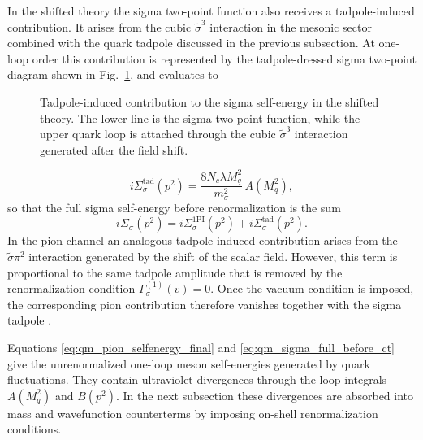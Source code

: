In the shifted theory the sigma two-point function also receives a
tadpole-induced contribution. It arises from the cubic
\(\tilde{\sigma}^3\) interaction in the mesonic sector combined with
the quark tadpole discussed in the previous subsection. At one-loop
order this contribution is represented by the tadpole-dressed sigma
two-point diagram shown in Fig.~\ref{fig:qm_sigma_tadpole_selfenergy},
and evaluates to

\begin{figure}[t]
\centering
{}
\caption{Tadpole-induced contribution to the sigma self-energy in the shifted theory. The lower line is the sigma two-point function, while the upper quark loop is attached through the cubic \(\tilde{\sigma}^3\) interaction generated after the field shift.}
\label{fig:qm_sigma_tadpole_selfenergy}
\end{figure}

\begin{equation}
i\Sigma_{\sigma}^{\mathrm{tad}}(p^2)
=
\frac{8N_c\lambda M_q^2}{m_\sigma^2}\,A(M_q^2),
\label{eq:qm_sigma_tadpole_part}
\end{equation}
so that the full sigma self-energy before renormalization is the sum
\begin{equation}
i\Sigma_\sigma(p^2)
=
i\Sigma_{\sigma}^{\mathrm{1PI}}(p^2)
+
i\Sigma_{\sigma}^{\mathrm{tad}}(p^2).
\label{eq:qm_sigma_full_before_ct}
\end{equation}
In the pion channel an analogous tadpole-induced contribution arises
from the $\tilde{\sigma}\pi^2$ interaction generated by the shift of
the scalar field. However, this term is proportional to the same
tadpole amplitude that is removed by the renormalization condition
$\Gamma_\sigma^{(1)}(v)=0$. Once the vacuum condition is imposed,
the corresponding pion contribution therefore vanishes together with
the sigma tadpole \cite{Folkestad2018}.

Equations \eqref{eq:qm_pion_selfenergy_final} and
\eqref{eq:qm_sigma_full_before_ct} give the unrenormalized one-loop
meson self-energies generated by quark fluctuations. They contain
ultraviolet divergences through the loop integrals \(A(M_q^2)\) and
\(B(p^2)\). In the next subsection these divergences are absorbed into
mass and wavefunction counterterms by imposing on-shell
renormalization conditions.

